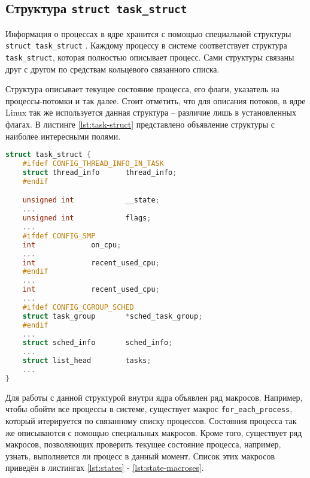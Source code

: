 \subsection{Структура \texttt{struct task\_struct}}

Информация о процессах в ядре хранится с помощью специальной структуры \texttt{struct task\_struct} \cite{task-struct}. Каждому процессу в системе соответствует структура \texttt{task\_struct}, которая полностью описывает процесс. Сами структуры связаны друг с другом по средствам кольцевого связанного списка. 

Структура описывает текущее состояние процесса, его флаги, указатель на процессы-потомки и так далее. Стоит отметить, что для описания потоков, в ядре Linux так же используется данная структура -- различие лишь в установленных флагах. В листинге \ref{lst:task-struct} представлено объявление структуры с наиболее интересными полями.\\

\begin{lstlisting}[label=lst:task-struct, caption=Листинг структуры task\_struct с наиболее интересными полями, language=c]
struct task_struct {
	#ifdef CONFIG_THREAD_INFO_IN_TASK
	struct thread_info		thread_info;
	#endif

	unsigned int			__state;
	...
	unsigned int			flags;
	...
	#ifdef CONFIG_SMP
	int				on_cpu;
	...
	int				recent_used_cpu;
	#endif
	...
	int				recent_used_cpu;
	...
	#ifdef CONFIG_CGROUP_SCHED
	struct task_group		*sched_task_group;
	#endif
	...
	struct sched_info		sched_info;
	...
	struct list_head		tasks;
	...
}
\end{lstlisting}

Для работы с данной структурой внутри ядра объявлен ряд макросов. Например, чтобы обойти все процессы в системе, существует макрос \texttt{for\_each\_process}, который итерируется по связанному списку процессов. Состояния процесса так же описываются с помощью специальных макросов. Кроме того, существует ряд макросов, позволяющих проверить текущее состояние процесса, например, узнать, выполняется ли процесс в данный момент. Список этих макросов приведён в листингах \ref{lst:states} - \ref{lst:state-macroses}.\\

